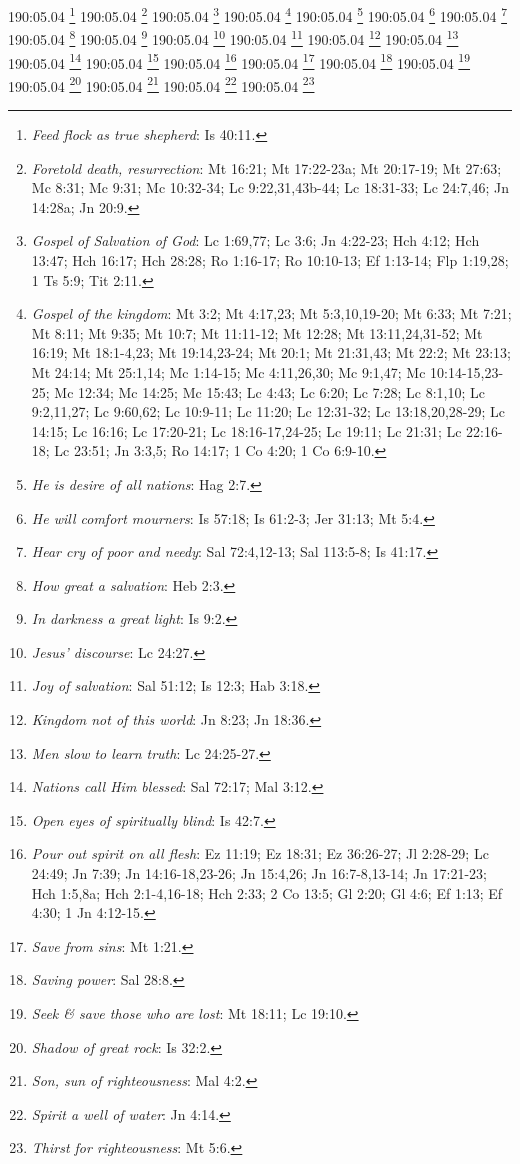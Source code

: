 {{{{{{{{{{{{{{{{{{{{{{{{{{{{{{{{{{{{{{{{{{{{{{{{{{{{{{{{{{{{{{{{{{{{{{{{{{{{{{{{{{{{{{{{{{{{{{{{190:05.04 \footnote{\textit{Feed flock as true shepherd}: Is 40:11.}
190:05.04 \footnote{\textit{Foretold death, resurrection}: Mt 16:21; Mt 17:22-23a; Mt 20:17-19; Mt 27:63; Mc 8:31; Mc 9:31; Mc 10:32-34; Lc 9:22,31,43b-44; Lc 18:31-33; Lc 24:7,46; Jn 14:28a; Jn 20:9.}
190:05.04 \footnote{\textit{Gospel of Salvation of God}: Lc 1:69,77; Lc 3:6; Jn 4:22-23; Hch 4:12; Hch 13:47; Hch 16:17; Hch 28:28; Ro 1:16-17; Ro 10:10-13; Ef 1:13-14; Flp 1:19,28; 1 Ts 5:9; Tit 2:11.}
190:05.04 \footnote{\textit{Gospel of the kingdom}: Mt 3:2; Mt 4:17,23; Mt 5:3,10,19-20; Mt 6:33; Mt 7:21; Mt 8:11; Mt 9:35; Mt 10:7; Mt 11:11-12; Mt 12:28; Mt 13:11,24,31-52; Mt 16:19; Mt 18:1-4,23; Mt 19:14,23-24; Mt 20:1; Mt 21:31,43; Mt 22:2; Mt 23:13; Mt 24:14; Mt 25:1,14; Mc 1:14-15; Mc 4:11,26,30; Mc 9:1,47; Mc 10:14-15,23-25; Mc 12:34; Mc 14:25; Mc 15:43; Lc 4:43; Lc 6:20; Lc 7:28; Lc 8:1,10; Lc 9:2,11,27; Lc 9:60,62; Lc 10:9-11; Lc 11:20; Lc 12:31-32; Lc 13:18,20,28-29; Lc 14:15; Lc 16:16; Lc 17:20-21; Lc 18:16-17,24-25; Lc 19:11; Lc 21:31; Lc 22:16-18; Lc 23:51; Jn 3:3,5; Ro 14:17; 1 Co 4:20; 1 Co 6:9-10.}
190:05.04 \footnote{\textit{He is desire of all nations}: Hag 2:7.}
190:05.04 \footnote{\textit{He will comfort mourners}: Is 57:18; Is 61:2-3; Jer 31:13; Mt 5:4.}
190:05.04 \footnote{\textit{Hear cry of poor and needy}: Sal 72:4,12-13; Sal 113:5-8; Is 41:17.}
190:05.04 \footnote{\textit{How great a salvation}: Heb 2:3.}
190:05.04 \footnote{\textit{In darkness a great light}: Is 9:2.}
190:05.04 \footnote{\textit{Jesus' discourse}: Lc 24:27.}
190:05.04 \footnote{\textit{Joy of salvation}: Sal 51:12; Is 12:3; Hab 3:18.}
190:05.04 \footnote{\textit{Kingdom not of this world}: Jn 8:23; Jn 18:36.}
190:05.04 \footnote{\textit{Men slow to learn truth}: Lc 24:25-27.}
190:05.04 \footnote{\textit{Nations call Him blessed}: Sal 72:17; Mal 3:12.}
190:05.04 \footnote{\textit{Open eyes of spiritually blind}: Is 42:7.}
190:05.04 \footnote{\textit{Pour out spirit on all flesh}: Ez 11:19; Ez 18:31; Ez 36:26-27; Jl 2:28-29; Lc 24:49; Jn 7:39; Jn 14:16-18,23-26; Jn 15:4,26; Jn 16:7-8,13-14; Jn 17:21-23; Hch 1:5,8a; Hch 2:1-4,16-18; Hch 2:33; 2 Co 13:5; Gl 2:20; Gl 4:6; Ef 1:13; Ef 4:30; 1 Jn 4:12-15.}
190:05.04 \footnote{\textit{Save from sins}: Mt 1:21.}
190:05.04 \footnote{\textit{Saving power}: Sal 28:8.}
190:05.04 \footnote{\textit{Seek & save those who are lost}: Mt 18:11; Lc 19:10.}
190:05.04 \footnote{\textit{Shadow of great rock}: Is 32:2.}
190:05.04 \footnote{\textit{Son, sun of righteousness}: Mal 4:2.}
190:05.04 \footnote{\textit{Spirit a well of water}: Jn 4:14.}
190:05.04 \footnote{\textit{Thirst for righteousness}: Mt 5:6.}
}}}}}}}}}}}}}}}}}}}}}}}}}}}}}}}}}}}}}}}}}}}}}}}}}}}}}}}}}}}}}}}}}}}}}}}}}}}}}}}}}}}}}}}}}}}}}}}}
